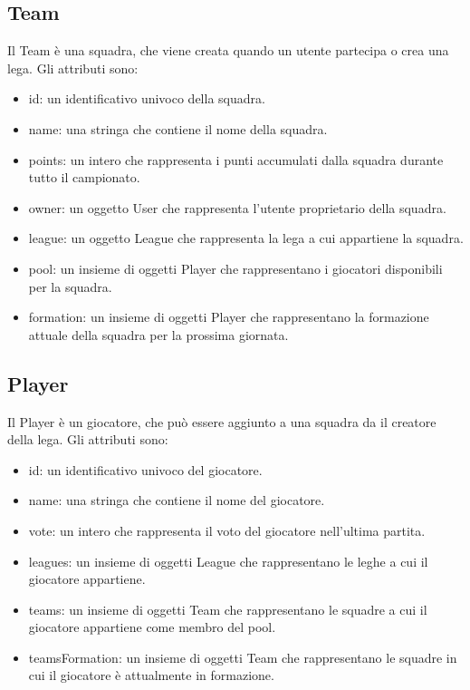 \documentclass[twoside,openright,titlepage,fleqn,headinclude,12pt,a4paper,BCOR=5mm,footinclude]{scrbook}
\begin{document}
\subsection{Team} Il Team è una squadra, che viene creata quando un utente partecipa o crea una lega. Gli attributi sono:

\begin{itemize} 
    \item id: un identificativo univoco della squadra. 
    \item name: una stringa che contiene il nome della squadra. 
    \item points: un intero che rappresenta i punti accumulati dalla squadra durante tutto il campionato.
    \item owner: un oggetto User che rappresenta l'utente proprietario della squadra. 
    \item league: un oggetto League che rappresenta la lega a cui appartiene la squadra. 
    \item pool: un insieme di oggetti Player che rappresentano i giocatori disponibili per la squadra. 
    \item formation: un insieme di oggetti Player che rappresentano la formazione attuale della squadra per la prossima giornata.
\end{itemize}

\subsection{Player} 
Il Player è un giocatore, che può essere aggiunto a una squadra da il creatore della lega. Gli attributi sono:

\begin{itemize} 
    \item id: un identificativo univoco del giocatore. 
    \item name: una stringa che contiene il nome del giocatore. 
    \item vote: un intero che rappresenta il voto del giocatore nell'ultima partita. 
    \item leagues: un insieme di oggetti League che rappresentano le leghe a cui il giocatore appartiene. 
    \item teams: un insieme di oggetti Team che rappresentano le squadre a cui il giocatore appartiene come membro del pool. 
    \item teamsFormation: un insieme di oggetti Team che rappresentano le squadre in cui il giocatore è attualmente in formazione.
\end{itemize}
\end{document}
